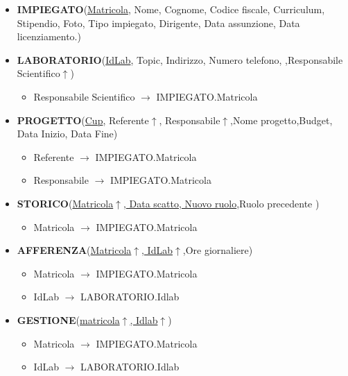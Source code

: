 \begin{itemize}
\item \textbf{IMPIEGATO}(\underline{Matricola}, Nome, Cognome, Codice fiscale, Curriculum, Stipendio, Foto, Tipo impiegato, Dirigente, Data assunzione, Data licenziamento.)
\\

\item \textbf{LABORATORIO}(\underline{IdLab}, Topic, Indirizzo, Numero telefono, ,Responsabile Scientifico$\uparrow$)
\begin{itemize}
    \item Responsabile Scientifico $\rightarrow$ IMPIEGATO.Matricola\\
\end{itemize}


\item \textbf{PROGETTO}(\underline{Cup}, Referente$\uparrow$, Responsabile$\uparrow$,Nome progetto,Budget, Data Inizio, Data Fine)
\begin{itemize}
    \item Referente $\rightarrow$ IMPIEGATO.Matricola
    \item Responsabile $\rightarrow$ IMPIEGATO.Matricola\\
\end{itemize}


\item \textbf{STORICO}(\underline{Matricola$\uparrow$, Data scatto, Nuovo ruolo},Ruolo precedente )
\begin{itemize}
    \item Matricola $\rightarrow$ IMPIEGATO.Matricola\\
\end{itemize}


\item \textbf{AFFERENZA}(\underline{Matricola$\uparrow$, IdLab$\uparrow$},Ore giornaliere)
\begin{itemize}
    \item Matricola $\rightarrow$ IMPIEGATO.Matricola
    \item IdLab $\rightarrow$ LABORATORIO.Idlab\\
\end{itemize}


\item \textbf{GESTIONE}(\underline{matricola$\uparrow$, Idlab$\uparrow$})
\begin{itemize}
    \item Matricola $\rightarrow$ IMPIEGATO.Matricola
    \item IdLab $\rightarrow$ LABORATORIO.Idlab\\
\end{itemize}


\end{itemize}
\newpage
